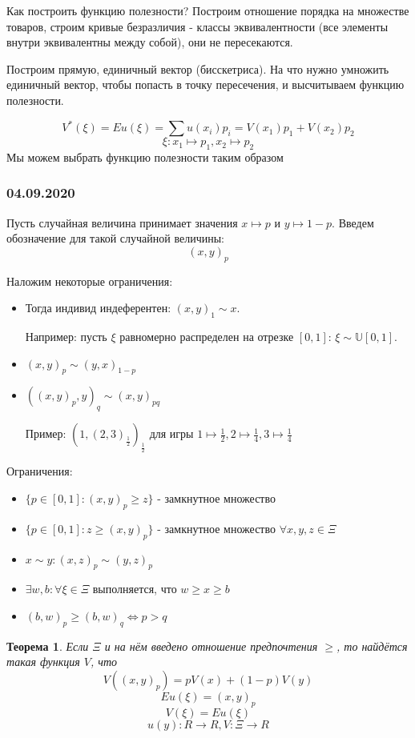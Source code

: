 \documentclass[%
12pt, %
final, %
oneside, %
onecolumn, %
centertags]{article} %
\theoremstyle{plain}
\newtheorem{theorem}{Теорема}[section] %
\theoremstyle{definition}
\theoremstyle{remark}
\begin{document}
Как построить функцию полезности? Построим отношение порядка на множестве товаров, строим кривые безразличия - классы эквивалентности (все элементы внутри эквивалентны между собой), они не пересекаются.

Построим прямую, единичный вектор (бисскетриса). На что нужно умножить единичный вектор, чтобы попасть в точку пересечения, и высчитываем функцию полезности.

$$V^*(\xi) = Eu(\xi) = \sum\limits u(x_i)p_i = V(x_1)p_1+V(x_2)p_2$$
$$\xi: x_1 \mapsto p_1,  x_2 \mapsto p_2$$
Мы можем выбрать функцию полезности таким образом

\subsubsection{04.09.2020}

Пусть случайная величина принимает значения $x \mapsto p$ и $y \mapsto 1-p$. Введем обозначение для такой случайной величины:
$$(x,y)_p$$

Наложим некоторые ограничения:
\begin{itemize}
	\item Тогда индивид индеферентен: $(x,y)_1 \sim x$.

	Например: пусть $\xi$ равномерно распределен на отрезке $[0,1]$: $\xi \sim \mathbb{U}[0,1]$.
	\item $(x,y)_p \sim (y,x)_{1-p}$
	\item $((x,y)_p,y)_q \sim (x,y)_{pq}$

	Пример: $(1,(2,3)_{\frac{1}{2}})_{\frac{1}{2}}$ для игры $1 \mapsto \frac{1}{2},2 \mapsto \frac{1}{4},3 \mapsto \frac{1}{4}$
\end{itemize}

Ограничения:
\begin{itemize}
	\item $\{p \in [0,1]: (x,y)_p \geq z\}$ - замкнутное множество
	\item $\{p \in [0,1]: z \geq (x,y)_p \}$ - замкнутное множество $\forall x,y,z \in \Xi$
	\item $x \sim y: (x,z)_p \sim (y,z)_p$
	\item $\exists w,b: \forall \xi \in \Xi$ выполняется, что $w \geq x \geq b$
	\item $(b,w)_p \geq (b,w)_q \Leftrightarrow p > q$
\end{itemize}

\begin{theorem}
	Если $\Xi$ и на нём введено отношение предпочтения $\geq$, то найдётся такая функция $V$, что $$V((x,y)_p) = pV(x)+(1-p)V(y)$$
	$$Eu(\xi) = (x,y)_p$$
	$$V(\xi) = Eu(\xi)$$
	$$u(y): R \to R, V: \Xi \to R$$
\end{theorem}
\end{document}
